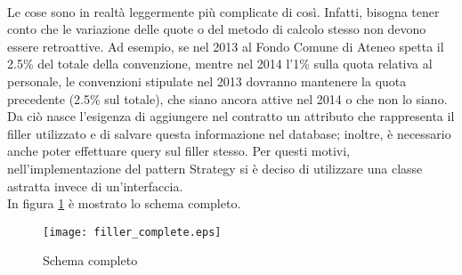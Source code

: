 \paragraph{}
Le cose sono in realtà leggermente più complicate di così. Infatti, bisogna tener conto che le variazione delle quote o del metodo di calcolo stesso non devono essere retroattive. Ad esempio, se nel 2013 al Fondo Comune di Ateneo spetta il 2.5\% del totale della convenzione, mentre nel 2014 l'1\% sulla quota relativa al personale, le convenzioni stipulate nel 2013 dovranno mantenere la quota precedente (2.5\% sul totale), che siano ancora attive nel 2014 o che non lo siano. Da ciò nasce l'esigenza di aggiungere nel contratto un attributo che rappresenta il filler utilizzato e di salvare questa informazione nel database; inoltre, è necessario anche poter effettuare query sul filler stesso. Per questi motivi, nell'implementazione del pattern Strategy si è deciso di utilizzare una classe astratta invece di un'interfaccia.\\
In figura \ref{filler_complete} è mostrato lo schema completo.

\begin{figure}[h]
\centering
\texttt{[image: filler\_complete.eps]}
\caption{Schema completo}
\label{filler_complete}
\end{figure}